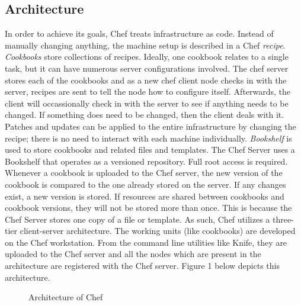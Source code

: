 \documentclass[a4paper, 12pt]{article}
\begin{document}
\subsection{Architecture}
In order to achieve its goals, Chef treats infrastructure as code. Instead of manually changing anything, the machine setup is described in a Chef \textit{recipe}. \textit{Cookbooks} store collections of recipes. Ideally, one cookbook relates to a single task, but it can have numerous server configurations involved. The chef server stores each of the cookbooks and as a new chef client node checks in with the server, recipes are sent to tell the node how to configure itself. Afterwards, the client will occassionally check in with the server to see if anything needs to be changed. If something does need to be changed, then the client deals with it. Patches and updates can be applied to the entire infrastructure by changing the recipe; there is no need to interact with each machine individually.
\textit{Bookshelf} is used to store cookbooks and related files and templates. The Chef Server uses a Bookshelf that operates as a versioned repository. Full root access is required. Whenever a cookbook is uploaded to the Chef server, the new version of the cookbook is compared to the one already stored on the server. If any changes exist, a new version is stored. If resources are shared between cookbooks and cookbook versions, they will not be stored more than once. This is because the Chef Server stores one copy of a file or template.
As such, Chef utilizes a three-tier client-server architecture. The working units (like cookbooks) are developed on the Chef workstation. From the command line utilities like Knife, they are uploaded to the Chef server and all the nodes which are present in the architecture are registered with the Chef server. Figure 1 below depicts this architecture.\\

\begin{figure}[H] 
\begin{center}
\end{center}
\caption{Architecture of Chef} \label{fig:1}
\end{figure}
\end{document}
